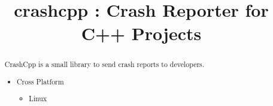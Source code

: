 \documentclass{article}
\begin{document}
\title{crashcpp : Crash Reporter for C++ Projects}

\maketitle

\begin{abstract}
\noindent
CrashCpp is a small library to send crash reports to developers.

\begin{itemize}
  \item Cross Platform
  \begin{itemize}
    \item Linux
  \end{itemize}
\end{itemize}

\end{abstract}

\setcounter{tocdepth}{2}
\tableofcontents

\newpage
\end{document}
